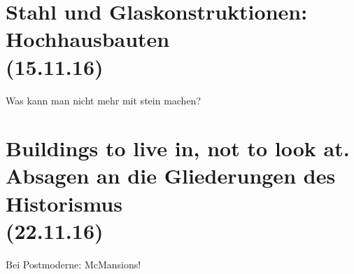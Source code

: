\documentclass[]{scrartcl}
\begin{document}
\section{Stahl und Glaskonstruktionen: Hochhausbauten\\(15.11.16)}


Was kann man nicht mehr mit stein machen?

\section{Buildings to live in, not to look at. Absagen an die Gliederungen des Historismus\\(22.11.16)}

Bei Postmoderne: McMansions!

%
\end{document}
